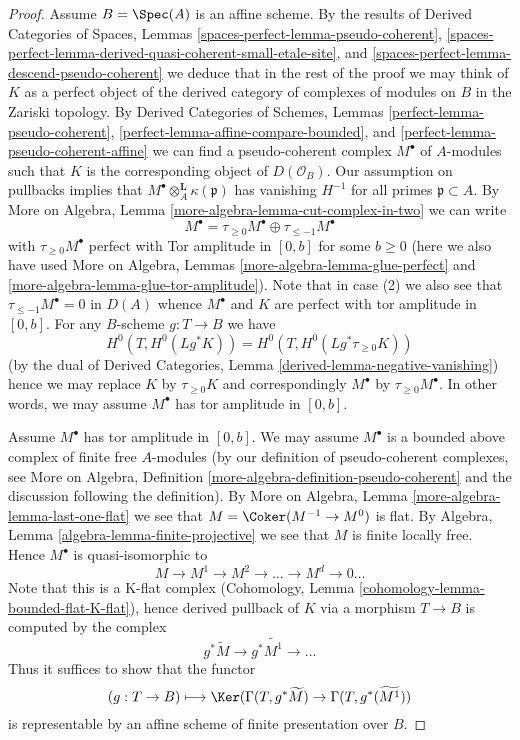 \begin{proof}
\medskip\noindent
Assume $B = \Spec(A)$ is an affine scheme. By the results of
Derived Categories of Spaces, Lemmas
\ref{spaces-perfect-lemma-pseudo-coherent},
\ref{spaces-perfect-lemma-derived-quasi-coherent-small-etale-site}, and
\ref{spaces-perfect-lemma-descend-pseudo-coherent}
we deduce that in the rest of the proof we may think of $K$ as a perfect
object of the derived category of complexes of modules on $B$
in the Zariski topology. By 
Derived Categories of Schemes, Lemmas
\ref{perfect-lemma-pseudo-coherent},
\ref{perfect-lemma-affine-compare-bounded}, and
\ref{perfect-lemma-pseudo-coherent-affine} we can find a pseudo-coherent
complex $M^\bullet$ of $A$-modules such that $K$ is the corresponding
object of $D(\mathcal{O}_B)$. Our assumption on pullbacks implies
that $M^\bullet \otimes^\mathbf{L}_A \kappa(\mathfrak p)$
has vanishing $H^{-1}$ for all primes $\mathfrak p \subset A$.
By More on Algebra, Lemma \ref{more-algebra-lemma-cut-complex-in-two}
we can write
$$
M^\bullet =
\tau_{\geq 0}M^\bullet \oplus \tau_{\leq - 1}M^\bullet
$$
with $\tau_{\geq 0}M^\bullet$ perfect with Tor amplitude in $[0, b]$
for some $b \geq 0$ (here we also have used
More on Algebra, Lemmas \ref{more-algebra-lemma-glue-perfect} and
\ref{more-algebra-lemma-glue-tor-amplitude}).
Note that in case (2) we also see that $\tau_{\leq - 1}M^\bullet = 0$
in $D(A)$ whence $M^\bullet$ and $K$ are perfect with
tor amplitude in $[0, b]$. For any $B$-scheme $g : T \to B$ we have
$$
H^0(T, H^0(Lg^*K)) = H^0(T, H^0(Lg^*\tau_{\geq 0}K))
$$
(by the dual of Derived Categories, Lemma
\ref{derived-lemma-negative-vanishing})
hence we may replace $K$ by $\tau_{\geq 0}K$ and correspondingly
$M^\bullet$ by $\tau_{\geq 0}M^\bullet$. In other words, we may
assume $M^\bullet$ has tor amplitude in $[0, b]$.

\medskip\noindent
Assume $M^\bullet$ has tor amplitude in $[0, b]$.
We may assume $M^\bullet$ is a bounded above complex of finite free
$A$-modules (by our definition of pseudo-coherent complexes, see
More on Algebra, Definition \ref{more-algebra-definition-pseudo-coherent}
and the discussion following the definition).
By More on Algebra, Lemma \ref{more-algebra-lemma-last-one-flat}
we see that $M = \Coker(M^{- 1} \to M^0)$ is flat. By
Algebra, Lemma \ref{algebra-lemma-finite-projective} we see that $M$
is finite locally free. Hence $M^\bullet$ is quasi-isomorphic to
$$
M \to M^1 \to M^2 \to \ldots \to M^d \to 0 \ldots
$$
Note that this is a K-flat complex
(Cohomology, Lemma \ref{cohomology-lemma-bounded-flat-K-flat}),
hence derived pullback of $K$ via a morphism $T \to B$ is computed
by the complex
$$
g^*\widetilde{M} \to g^*\widetilde{M^1} \to \ldots
$$
Thus it suffices to show that the functor
$$
(g : T \to B) \longmapsto
\Ker(
\Gamma(T,g^*\widetilde{M})
\to
\Gamma(T, g^*(\widetilde{M^1})
)
$$
is representable by an affine scheme of finite presentation over $B$.


\end{proof}
